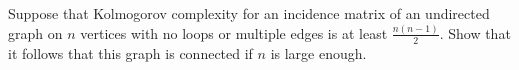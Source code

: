 Suppose that Kolmogorov complexity for an incidence matrix of an undirected graph on $n$ vertices with no
loops or multiple edges is at least $\frac{n (n - 1)}{2}$. Show that it follows that this graph is
connected if $n$ is large enough.